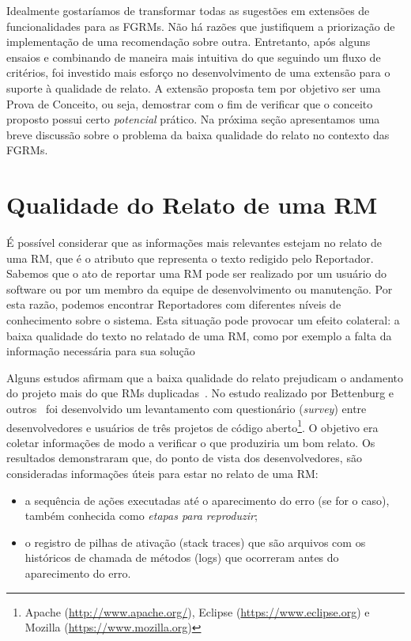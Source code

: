 Idealmente gostaríamos de transformar todas as sugestões em extensões de
funcionalidades para as FGRMs. Não há razões que justifiquem a priorização de
implementação de uma recomendação sobre outra. Entretanto, após alguns ensaios e
combinando de maneira mais intuitiva do que seguindo um fluxo de critérios,  foi
investido mais esforço no desenvolvimento de uma extensão para o suporte à
qualidade de relato. A extensão proposta tem por objetivo ser uma Prova de
Conceito, ou seja, demostrar com o fim de verificar que o conceito proposto
possui certo \textit{potencial} prático. Na próxima seção apresentamos uma breve
discussão sobre o problema da baixa qualidade do relato no contexto das FGRMs.

\section{Qualidade do Relato de uma RM}
\label{sec:avaliando_a_qualidade_do_relato_de_uma_rm}

É possível considerar que as informações mais relevantes estejam no relato de
uma RM, que é o atributo que representa o texto redigido pelo Reportador.
Sabemos que o ato de reportar uma RM pode ser realizado por um usuário do
software ou por um membro da equipe de desenvolvimento ou manutenção. Por esta
razão, podemos encontrar Reportadores com diferentes níveis de conhecimento
sobre o sistema. Esta situação pode provocar um efeito colateral: a baixa
qualidade do texto no relatado de uma RM, como por exemplo a falta da informação
necessária para sua solução

Alguns estudos afirmam que a baixa qualidade do relato prejudicam o andamento do
projeto mais do que RMs duplicadas~\cite{bettenburg2007quality}. No estudo
realizado por Bettenburg e outros~\cite{bettenburg2008makes} foi desenvolvido um
levantamento com questionário (\textit{survey}) entre desenvolvedores e usuários
de três projetos de código aberto\footnote{Apache
    (\url{http://www.apache.org/}), Eclipse (\url{https://www.eclipse.org}) e
    Mozilla (\url{https://www.mozilla.org})}. O objetivo era coletar informações
de modo a verificar o que produziria um bom relato. Os resultados demonstraram
que, do ponto de vista dos desenvolvedores, são consideradas informações úteis
para estar no relato de uma RM\@:

\begin{itemize}
    \item a sequência de ações executadas até o aparecimento do erro (se for o
        caso), também conhecida como \textit{etapas para reproduzir};
    \item o registro de pilhas de ativação (stack traces) que são arquivos com
        os históricos de chamada de métodos (logs) que ocorreram antes do
        aparecimento do erro.
\end{itemize}


